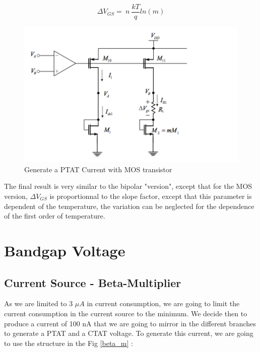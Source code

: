 \documentclass[11pt,a4paper]{report}
\begin{document}
\begin{equation}
  \Delta V_{GS} = ~n~\frac{kT}{q}ln(m)
\end{equation} 

\begin{figure}[h]
  \begin{center}
    \includegraphics[scale=0.3]{photo/PTAT_MOS}
  \end{center}
  \caption{Generate a PTAT Current with MOS transistor}
  \label{PTAT_MOS}
\end{figure}

The final result is very similar to the bipolar "version", except that for the MOS version, $\Delta V_{GS}$ is proportionnal to the slope factor, except that this parameter is dependent of the temperature, the variation can be neglected for the dependence of the first order of temperature. 

\chapter{Bandgap Voltage}
\section{Current Source - Beta-Multiplier}

As we are limited to 3 $\mu A$ in current consumption, we are going to limit the current consumption in the current source to the minimum. We decide then to produce a current of 100 nA that we are going to mirror in the different branches to generate a PTAT and a CTAT voltage.
To generate this current, we are going to use the structure in the Fig \ref{beta_m} :
\end{document}
